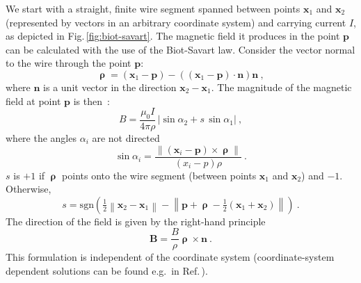We start with a straight, finite wire segment spanned between points $\mathbf{x}_1$ and $\mathbf{x}_2$ (represented by vectors in an arbitrary coordinate system) and carrying current $I$, as depicted in Fig.\,\ref{fig:biot-savart}. The magnetic field it produces in the point $\mathbf{p}$ can be calculated with the use of the Biot-Savart law. Consider the vector normal to the wire through the point $\mathbf{p}$:
\begin{equation}
  \boldsymbol{\uprho} = (\mathbf{x}_1 - \mathbf{p}) - \left( \left( \mathbf{x}_1 - \mathbf{p} \right) \cdot \mathbf{n} \right)\mathbf{n} \ ,
\end{equation}
where $\mathbf{n}$ is a unit vector in the direction $\mathbf{x}_2 -\mathbf{x}_1$.
The magnitude of the magnetic field at point $\mathbf{p}$ is then~\cite{Griffith}:
\begin{equation}
  \label{eq:biot_savart}
  B = \frac{\mu_0 I}{4 \pi \rho} \, \left| \sin \alpha_2 + s\, \sin \alpha_1 \right| \ ,
\end{equation}
where the angles $\alpha_i$ are not directed
\begin{equation}
  \sin \alpha_i = \frac{ \left\lVert \left( \mathbf{x}_i - \mathbf{p} \right) \times \boldsymbol{\uprho} \right\rVert }{ (x_i  - p) \rho } \ .
\end{equation}
$s$ is $+1$ if $\boldsymbol{\uprho}$ points onto the wire segment (between points $\mathbf{x}_1$ and $\mathbf{x}_2$) and $-1$. Otherwise,
\begin{equation}
  s = \mathrm{sgn}\left( \tfrac{1}{2} \left\lVert \mathbf{x}_2 - \mathbf{x}_1 \right\rVert -
  \left\lVert \mathbf{p} + \boldsymbol{\uprho} - \tfrac{1}{2} \left( \mathbf{x}_1 + \mathbf{x}_2 \right) \right\rVert \right) \ .
\end{equation}
The direction of the field is given by the right-hand principle
\begin{equation}
  \mathbf{B} = \frac{B}{\rho} \boldsymbol{\uprho} \times \mathbf{n} \ .
\end{equation}
This formulation is independent of the coordinate system (coordinate-system dependent solutions can be found e.g.\ in Ref.\,\cite{Grivich2000}).

